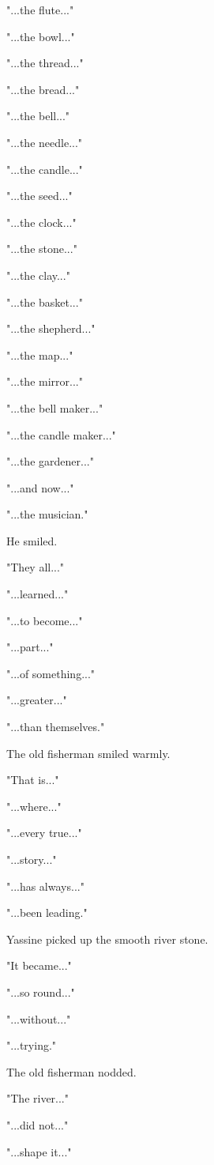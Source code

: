 \documentclass[12pt,openany]{book}
\begin{document}
"...the flute..."

"...the bowl..."

"...the thread..."

"...the bread..."

"...the bell..."

"...the needle..."

"...the candle..."

"...the seed..."

"...the clock..."

"...the stone..."

"...the clay..."

"...the basket..."

"...the shepherd..."

"...the map..."

"...the mirror..."

"...the bell maker..."

"...the candle maker..."

"...the gardener..."

"...and now..."

"...the musician."

He smiled.

"They all..."

"...learned..."

"...to become..."

"...part..."

"...of something..."

"...greater..."

"...than themselves."

The old fisherman smiled warmly.

"That is..."

"...where..."

"...every true..."

"...story..."

"...has always..."

"...been leading."

Yassine picked up the smooth river stone.

"It became..."

"...so round..."

"...without..."

"...trying."

The old fisherman nodded.

"The river..."

"...did not..."

"...shape it..."
\end{document}
